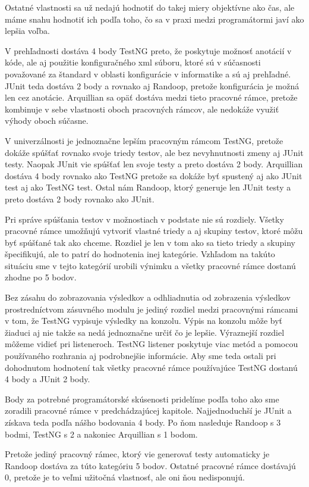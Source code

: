 \documentclass[11pt,twoside,slovak,a4paper]{article}
\begin{document}
	Ostatné vlastnosti sa už nedajú hodnotiť do takej miery objektívne ako čas, ale máme snahu hodnotiť ich podľa toho, čo sa v praxi medzi programátormi javí ako lepšia voľba.
	
	V prehľadnosti dostáva 4 body TestNG preto, že poskytuje možnosť anotácií v kóde, ale aj použitie konfiguračného xml súboru, ktoré sú v súčasnosti považované za štandard v oblasti konfigurácie v informatike a sú aj prehľadné. JUnit teda dostáva 2 body a rovnako aj Randoop, pretože konfigurácia je možná len cez anotácie. Arquillian sa opäť dostáva medzi tieto pracovné rámce, pretože kombinuje v sebe vlastnosti oboch pracovných rámcov, ale nedokáže využiť výhody oboch súčasne.
	
	V univerzálnosti je jednoznačne lepším pracovným rámcom TestNG, pretože dokáže spúšťať rovnako svoje triedy testov, ale bez nevyhnutnosti zmeny aj JUnit testy. Naopak JUnit vie spúšťať len svoje testy a preto dostáva 2 body. Arquillian dostáva 4 body rovnako ako TestNG pretože sa dokáže byť spustený aj ako JUnit test aj ako TestNG test. Ostal nám Randoop, ktorý generuje len JUnit testy a preto dostáva 2 body rovnako ako JUnit.
	
	Pri správe spúšťania testov v možnostiach v podstate nie sú rozdiely. Všetky pracovné rámce umožňujú vytvoriť vlastné triedy a aj skupiny testov, ktoré môžu byť spúšťané tak ako chceme. Rozdiel je len v tom ako sa tieto triedy a skupiny špecifikujú, ale to patrí do hodnotenia inej kategórie. Vzhľadom na takúto situáciu sme v tejto kategórií urobili výnimku a všetky pracovné rámce dostanú zhodne po 5 bodov.
	
	Bez zásahu do zobrazovania výsledkov a odhliadnutia od zobrazenia výsledkov prostredníctvom zásuvného modulu je jediný rozdiel medzi pracovnými rámcami v tom, že TestNG vypisuje výsledky na konzolu. Výpis na konzolu môže byť žiaduci aj nie takže sa nedá jednoznačne určiť čo je lepšie. Výraznejší rozdiel môžeme vidieť pri listeneroch. TestNG listener poskytuje viac metód a pomocou používaného rozhrania aj podrobnejšie informácie. Aby sme teda ostali pri dohodnutom hodnotení tak všetky pracovné rámce používajúce TestNG dostanú 4 body a JUnit 2 body.
	
	Body za potrebné programátorské skúsenosti pridelíme podľa toho ako sme zoradili pracovné rámce v predchádzajúcej kapitole. Najjednoduchší je JUnit a získava teda podľa nášho bodovania 4 body. Po ňom nasleduje Randoop s 3 bodmi, TestNG s 2 a nakoniec Arquillian s 1 bodom.	
	
	Pretože jediný pracovný rámec, ktorý vie generovať testy automaticky je Randoop dostáva za túto kategóriu 5 bodov. Ostatné pracovné rámce dostávajú 0, pretože je to veľmi užitočná vlastnosť, ale oni ňou nedisponujú.
\end{document}
